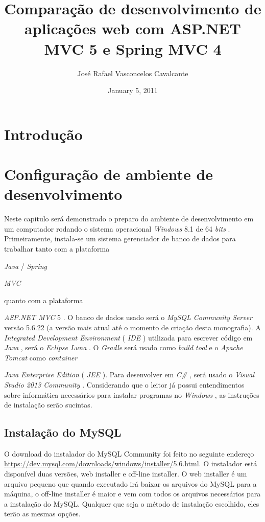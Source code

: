 \documentclass[a4paper,12pt]{article}
\newcommand{\anmvc} {
	\sigla{ASP.NET MVC} 5
}
\newcommand{\spring} {
	\lang{Java}/\est{Spring} \sigla{MVC}
}
\newcommand{\est}[1] {
	\textit{#1}
}
\newcommand{\sigla}[1] {
	\textit{#1}
}
\newcommand{\lang}[1] {
	\textit{#1}
}
\begin{document}
\title{Comparação de desenvolvimento de aplicações web com ASP.NET MVC 5 e Spring MVC 4}
\author{José Rafael Vasconcelos Cavalcante}
\date{January 5, 2011}
\maketitle

\section{Introdução}

\section{Configuração de ambiente de desenvolvimento}

Neste capitulo será demonstrado o preparo do ambiente de desenvolvimento em um computador rodando o sistema operacional \est{Windows} 8.1 de 64 \est{bits}. Primeiramente, instala-se um sistema gerenciador de banco de dados para trabalhar tanto com a plataforma \spring quanto com a plataforma \anmvc.  O banco de dados usado será o \est{MySQL Community Server} versão 5.6.22 (a versão mais atual até o momento de criação desta monografia). A \est{Integrated Development Environment} (\sigla{IDE}) utilizada  para escrever código em \lang{Java}, será o \est{Eclipse Luna}. O \est{Gradle} será usado como \est{build tool} e o \est{Apache Tomcat} como \est{container} \est{Java Enterprise Edition} (\sigla{JEE}). Para desenvolver em \lang{C\#}, será usado o \est{Visual Studio 2013 Community}. Considerando que o leitor já possui entendimentos sobre informática necessários para instalar programas no \est{Windows}, as instruções de instalação serão sucintas. 

\subsection{Instalação do MySQL}

O download do instalador do MySQL Community foi feito no seguinte endereço \url{https://dev.mysql.com/downloads/windows/installer/}5.6.html. O instalador está disponível duas versões, web installer e off-line installer. O web installer é um arquivo pequeno que quando executado irá baixar os arquivos do MySQL para a máquina, o off-line installer  é maior e vem com todos os arquivos necessários para a  instalação do MySQL. Qualquer que seja o método de instalação escolhido, eles terão as mesmas opções.
\end{document}
